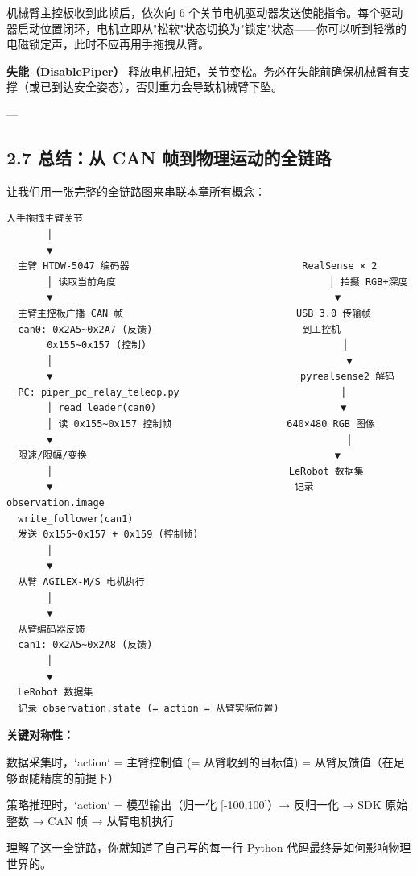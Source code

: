 \documentclass[UTF8,a4paper,11pt]{ctexart}
\begin{document}
机械臂主控板收到此帧后，依次向 6 个关节电机驱动器发送使能指令。每个驱动器启动位置闭环，电机立即从"松软"状态切换为"锁定"状态——你可以听到轻微的电磁锁定声，此时不应再用手拖拽从臂。

\textbf{失能（DisablePiper）} 释放电机扭矩，关节变松。务必在失能前确保机械臂有支撑（或已到达安全姿态），否则重力会导致机械臂下坠。

---

\subsection{2.7 总结：从 CAN 帧到物理运动的全链路}

让我们用一张完整的全链路图来串联本章所有概念：

\begin{lstlisting}[language=text]
  人手拖拽主臂关节
       │
       ▼
  主臂 HTDW-5047 编码器                              RealSense × 2
       │ 读取当前角度                                     │ 拍摄 RGB+深度
       ▼                                                 ▼
  主臂主控板广播 CAN 帧                              USB 3.0 传输帧
  can0: 0x2A5~0x2A7 (反馈)                          到工控机
       0x155~0x157 (控制)                                  │
       │                                                   ▼
       ▼                                           pyrealsense2 解码
  PC: piper_pc_relay_teleop.py                            │
       │ read_leader(can0)                                ▼
       │ 读 0x155~0x157 控制帧                    640×480 RGB 图像
       ▼                                                   │
  限速/限幅/变换                                           ▼
       │                                         LeRobot 数据集
       ▼                                          记录 observation.image
  write_follower(can1)
  发送 0x155~0x157 + 0x159 (控制帧)
       │
       ▼
  从臂 AGILEX-M/S 电机执行
       │
       ▼
  从臂编码器反馈
  can1: 0x2A5~0x2A8 (反馈)
       │
       ▼
  LeRobot 数据集
  记录 observation.state (= action = 从臂实际位置)
\end{lstlisting}

\textbf{关键对称性：}
\item 数据采集时，`action` = 主臂控制值 (= 从臂收到的目标值) = 从臂反馈值（在足够跟随精度的前提下）
\item 策略推理时，`action` = 模型输出（归一化 [-100,100]）→ 反归一化 → SDK 原始整数 → CAN 帧 → 从臂电机执行

理解了这一全链路，你就知道了自己写的每一行 Python 代码最终是如何影响物理世界的。
\end{document}
